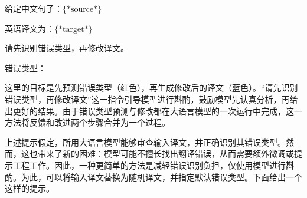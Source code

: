 \vspace{0.5em}
\begin{tcolorbox}

\begingroup
\setlength{\leftskip}{2em}
\setlength{\rightskip}{2em}

给定中文句子：$\{*\mathrm{source}*\}$

\vspace{0.2em}

英语译文为：$\{*\mathrm{target}*\}$


\vspace{0.5em}

请先识别错误类型，再修改译文。

\vspace{0.2em}

错误类型：\underline{}

\vspace{0.2em}

\underline{}

\endgroup

\end{tcolorbox}
\vspace{0.5em}


这里的目标是先预测错误类型（红色），再生成修改后的译文（蓝色）。“请先识别错误类型，再修改译文”这一指令引导模型进行斟酌，鼓励模型先认真分析，再给出更好的结果。由于错误类型预测与修改都在大语言模型的一次运行中完成，这一方法将反馈和改进两个步骤合并为一个过程。

上述提示假定，所用大语言模型能够审查输入译文，并正确识别其错误类型。然而，这也带来了新的困难：模型可能不擅长找出翻译错误，从而需要额外微调或提示工程工作。因此，一种更简单的方法是减轻错误识别负担，仅使用模型进行斟酌。为此，可以将输入译文替换为随机译文，并指定默认错误类型。下面给出一个这样的提示。

